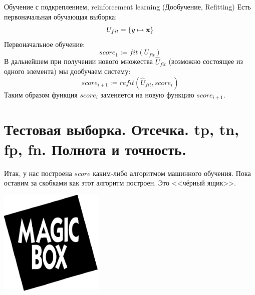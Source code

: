 \documentclass{beamer}
\begin{document}
   \begin{frame}{Обучение с подкреплением, reinforcement learning (Дообучение, Refitting)}
  	Есть первоначальная обучающая выборка: 
   \begin{equation*}
    U_{fit} = \left\{ y \mapsto \bold x  \right\}
   \end{equation*}
 	Первоначальное обучение:
  \begin{equation*}
  score_1 := fit (U_{fit}) 
  \end{equation*} 
  	В дальнейшем при получении нового множества $\hat U_{fit}$ (возможно состоящее из одного элемента)
  	мы дообучаем систему:
  	\begin{equation}
  	score_{i+1} := refit (\hat U_{fit}, score_{i}) 
  	\end{equation} 
   	Таким образом функция $score_i$ заменяется на новую функцию $score_{i+1}$.
   \end{frame}

	\section{Тестовая выборка. Отсечка. tp, tn, fp, fn. Полнота и точность.}\label{section:precision_recall_defs}

	\begin{frame}
	Итак, у нас построена $score$ каким-либо алгоритмом машинного обучения. 
	Пока оставим за скобками как этот алгоритм построен. Это <<чёрный ящик>>.
		
	\begin{center}
	\includegraphics[width=5cm]{../pic/magic_box.png}\centering
	\end{center}
	\end{frame}

	
\end{document}
